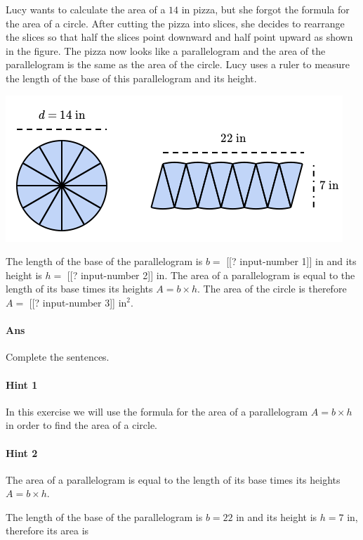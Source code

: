 \documentclass[twocolumn,10pt]{article}
\def\shrinkfactor{0.55}
\begin{document}
\noindent
Lucy wants to calculate the area of a $14\text{ in}$ pizza, but she forgot the formula for the area of a circle. After cutting the pizza into slices, she decides to rearrange the slices so that half the slices point downward and half point upward as shown in the figure. The pizza now looks like a parallelogram and the area of the parallelogram is the same as the area of the circle. Lucy uses a ruler to measure the length of the base of this parallelogram and its height.


\includegraphics[scale=\shrinkfactor]{figures/d9c172d7729db26550c8739d81ac4ffe0918907f.png}

The length of the base of the parallelogram is $b=$ [[? input-number 1]] $\text{in}$ 
and its height is $h=$ [[? input-number 2]] $\text{in}$. The area of a parallelogram is equal to the length of its base times its heights $A=b\times h$. The area of the circle is therefore $A=$ [[? input-number 3]] $\text{in}^2$. 

\paragraph{Ans} Complete the sentences. 

\paragraph{Hint 1}In this exercise we will use the formula for the area of a parallelogram $A=b\times h$ in order to find the area of a circle.

\paragraph{Hint 2}The area of a parallelogram is equal to the length of its base times its heights $A=b\times h$.

The length of the base of the parallelogram is $b=22\text{ in}$ and its height is $h=7\text{ in}$, therefore its area is 
\end{document}
